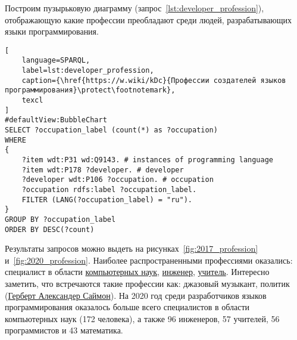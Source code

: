 \begin{marginfigure}[-302pt]
{
\setlength{\fboxsep}{0pt}
\setlength{\fboxrule}{1pt}
}
  \caption{Профессии людей, которые разрабатывают языки программирования (2017).}
  \label{fig:2017_profession}
\end{marginfigure}
\begin{marginfigure}[-52pt]
{
\setlength{\fboxsep}{0pt}
\setlength{\fboxrule}{1pt}
}
  \caption{Профессии людей, которые разрабатывают языки программирования (2020).}
  \label{fig:2020_profession}
\end{marginfigure}
Построим пузырьковую диаграмму (запрос~\ref{lst:developer_profession}), отображающую какие профессии преобладают среди людей, разрабатывающих языки программирования.

\begin{lstlisting}[
	language=SPARQL,
	label=lst:developer_profession,
	caption={\href{https://w.wiki/kDc}{Профессии создателей языков программирования}\protect\footnotemark},
	texcl
]
#defaultView:BubbleChart
SELECT ?occupation_label (count(*) as ?occupation)
WHERE
{
    ?item wdt:P31 wd:Q9143. # instances of programming language 
    ?item wdt:P178 ?developer. # developer
    ?developer wdt:P106 ?occupation. # occupation
    ?occupation rdfs:label ?occupation_label. 
    FILTER (LANG(?occupation_label) = "ru"). 
}
GROUP BY ?occupation_label 
ORDER BY DESC(?count)
\end{lstlisting}



Результаты запросов можно выдеть на рисунках~\ref{fig:2017_profession} и~\ref{fig:2020_profession}.
Наиболее распространенными профессиями оказались: специалист в области \href{https://www.wikidata.org/wiki/Q21198}{компьютерных наук}, \href{https://www.wikidata.org/wiki/Q81096}{инженер}, \href{https://www.wikidata.org/wiki/Q37226}{учитель}. Интересно заметить, что встречаются такие профессии как: джазовый музыкант, политик (\href{https://www.wikidata.org/wiki/Q181529}{Герберт Александер Саймон}). На 2020 год среди разработчиков языков программирования оказалось больше всего специалистов в области компьютерных наук (172 человека), а также 96 инженеров, 57 учителей, 56 программистов и 43 математика.

